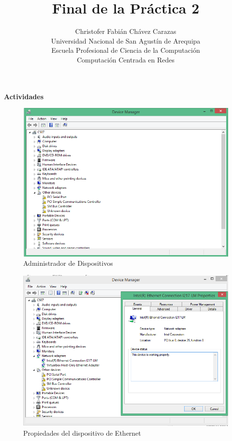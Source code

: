 \documentclass[a4paper,12pt]{article}
\begin{document}
\title{Final de la Práctica 2}
\author{
Christofer Fabián Chávez Carazas \\
\small{Universidad Nacional de San Agustín de Arequipa} \\
\small{Escuela Profesional de Ciencia de la Computación} \\
\small{Computación Centrada en Redes}
}
\date{}

\maketitle

\begin{large}
 \textbf{Actividades}
\end{large}

 
 \begin{figure}[H]
  \centering
  \includegraphics[scale = 0.5]{1.png}
  \caption{Administrador de Dispositivos}
 \end{figure}
 
 \begin{figure}[H]
  \centering
  \includegraphics[scale = 0.5]{2.png}
  \caption{Propiedades del dispositivo de Ethernet}
 \end{figure}
 
\end{document}
